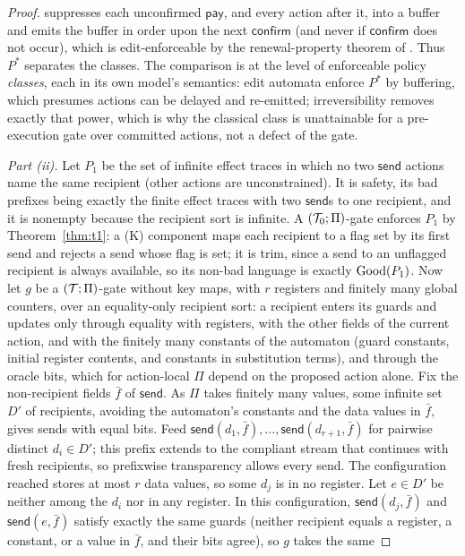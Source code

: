 \begin{proof}
suppresses each unconfirmed $\mathsf{pay}$, and every action after it, into a buffer and emits the buffer in order upon the next $\mathsf{confirm}$
(and never if $\mathsf{confirm}$ does not occur), which is edit-enforceable by the
renewal-property theorem of \citet{ligatti2009nonsafety}. Thus $P^{\ast}$ separates
the classes. The comparison is at the level of enforceable policy \emph{classes}, each in
its own model's semantics: edit automata enforce $P^{\ast}$ by buffering, which presumes
actions can be delayed and re-emitted; irreversibility removes exactly that power, which is
why the classical class is unattainable for a pre-execution gate over committed actions,
not a defect of the gate.

\emph{Part (ii).} Let $P_1$ be the set of infinite effect traces in which no two $\mathsf{send}$ actions name the same
recipient (other actions are unconstrained). It is safety, its bad prefixes being exactly the finite effect traces with two
$\mathsf{send}$s to one recipient, and it is nonempty because the recipient sort is infinite. A $(\mathcal{T}_0;\Pi)$-gate enforces $P_1$
by Theorem~\ref{thm:t1}: a (K) component maps each recipient to a flag set by its first send and rejects a send whose flag is
set; it is trim, since a send to an unflagged recipient is always available, so its non-bad language is exactly $\mathrm{Good}(P_1)$.
Now let $g$ be a $(\mathcal{T};\Pi)$-gate without key maps, with $r$ registers and finitely many global counters, over an
equality-only recipient sort: a recipient enters its guards and updates only through equality with registers, with the other
fields of the current action, and with the finitely many constants of the automaton (guard constants, initial register
contents, and constants in substitution terms), and through the oracle bits, which for action-local $\Pi$ depend on the
proposed action alone. Fix the non-recipient fields $\bar f$ of $\mathsf{send}$. As $\Pi$ takes finitely many values, some
infinite set $D'$ of recipients, avoiding the automaton's constants and the data values in $\bar f$, gives sends with equal
bits. Feed $\mathsf{send}(d_1,\bar f),\ldots,\mathsf{send}(d_{r+1},\bar f)$ for pairwise distinct $d_i\in D'$; this prefix extends
to the compliant stream that continues with fresh recipients, so prefixwise transparency allows every send. The configuration
reached stores at most $r$ data values, so some $d_j$ is in no register. Let $e\in D'$ be neither among the $d_i$ nor in any
register. In this configuration, $\mathsf{send}(d_j,\bar f)$ and $\mathsf{send}(e,\bar f)$ satisfy exactly the same guards
(neither recipient equals a register, a constant, or a value in $\bar f$, and their bits agree), so $g$ takes the same

\end{proof}
